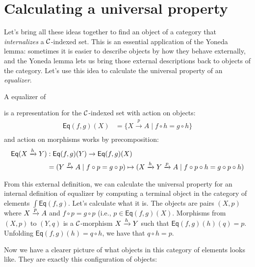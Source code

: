\section{Calculating a universal property}
Let's bring all these ideas together to find an object of a category that
\emph{internalizes} a $\mathcal C$-indexed set. 
This is an essential application of the Yoneda lemma: sometimes it is 
easier to describe objects by how they behave externally, and the Yoneda 
lemma lets us bring those external descriptions back to objects of the category.
Let's use this idea to calculate the universal property of an \emph{equalizer}.

\begin{definition}
  A equalizer of
is a representation for the $\mathcal C$-indexed set with action on 
objects:
\begin{align}
  \mathsf{Eq}(f,g)(X) &= \{ X \xrightarrow{p} A \mid f \circ h = g \circ h \} \\
\end{align}
and action on morphisms works by precomposition:
\begin{align}
  \mathsf{Eq}(X \xrightarrow{h} Y) &: \mathsf{Eq}(f,g)(Y) \to \mathsf{Eq}(f,g)(X)\\
  &= (Y \xrightarrow{p} A \mid f \circ p = g \circ p) \mapsto 
  (X \xrightarrow{h} Y \xrightarrow{p} A \mid f \circ p \circ h = g \circ p \circ h) 
\end{align}
\end{definition}

From this external definition, we can calculate the universal 
property for an internal definition of equalizer by 
computing a terminal object in the category of elements $\int \mathsf{Eq}(f,g)$.
Let's calculate what it is.
The objects are pairs $(X, p)$ where $X \xrightarrow{p} A$ and $f \circ p = g \circ p$ (i.e., $p \in \mathsf{Eq}(f,g)(X)$.
Morphisms from $(X, p)$ to $(Y, q)$ 
is a $\mathcal C$-morphism $X \xrightarrow{h} Y$ such that 
$\mathsf{Eq}(f, g)(h)(q) = p$. Unfolding $\mathsf{Eq}(f, g)(h) = q \circ h$, 
we have that $q \circ h = p$.

Now we have a clearer picture of what objects in this category 
of elements looks like. They are exactly this configuration of objects:

\begin{center}
\end{center}

